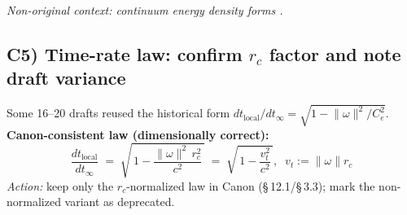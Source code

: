 \documentclass[11pt]{article}
\begin{document}
    \textit{Non-original context: continuum energy density forms \cite{LandauFluids}.}

    \subsection*{C5) Time-rate law: confirm $r_c$ factor and note draft variance}
    \label{subsec:timerate-consistency}

    Some 16–20 drafts reused the historical form $dt_{\text{local}}/dt_\infty=\sqrt{1- \lVert\omega\rVert^2/C_e^2}$.
    \textbf{Canon-consistent law (dimensionally correct):}
    \[
        \boxed{ \frac{dt_{\text{local}}}{dt_\infty} \;=\; \sqrt{\,1- \frac{\lVert\omega\rVert^2\,r_c^2}{c^2}\,}
        \;=\; \sqrt{\,1- \frac{v_t^2}{c^2}\,},\;\;v_t:=\lVert\omega\rVert r_c }
    \]
    \emph{Action:} keep only the $r_c$-normalized law in Canon (\S\,12.1/\S\,3.3); mark the non-normalized variant as deprecated.

\end{document}
